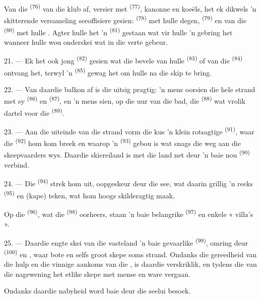 Van die  \textsuperscript{(76)} van die klub af, versier met
 \textsuperscript{(77)}, kanonne en koeëls, het ek dikwels 'n skitterende
versameling seeoffisiere gesien:  \textsuperscript{(78)} met hulle
degen,  \textsuperscript{(79)} en van die
 \textsuperscript{(80)} met hulle . Agter hulle het 'n
 \textsuperscript{(81)} gestaan wat vir hulle 'n 
gebring het wanneer hulle wou onderskei wat in die verte gebeur.

21. --- Ek het ook jong  \textsuperscript{(82)} gesien wat die
bevele van hulle  \textsuperscript{(83)} of van die 
\textsuperscript{(84)} ontvang het, terwyl 'n 
\textsuperscript{(85)} gewag het om hulle na die skip te bring.

22. --- Van daardie balkon af is die uitsig pragtig: 'n mens oorsien die hele strand met
sy  \textsuperscript{(86)} en  \textsuperscript{(87)},
en 'n mens sien, op die uur van die bad, die  \textsuperscript{(88)} wat
vrolik dartel voor die  \textsuperscript{(89)}.

23. --- Aan die uiteinde van die strand vorm die kus 'n klein rotsagtige
 \textsuperscript{(91)}, waar die 
\textsuperscript{(92)} hom kom breek en waarop 'n 
\textsuperscript{(93)} gebou is wat snags die weg aan die skeepvaarders wys. Daardie
skiereiland is met die land net deur 'n baie nou 
\textsuperscript{(90)} verbind.

\VUsaut{3.0mm}
\VUsaut{3.0mm}

24. --- Die  \textsuperscript{(94)} strek hom uit, oopgeskeur deur die
see, wat daarin grillig 'n reeks  \textsuperscript{(95)} en
 (kape) teken, wat hom hoogs skilderagtig maak.

Op die  \textsuperscript{(96)}, wat die 
\textsuperscript{(98)} oorheers, staan 'n baie belangrike 
\textsuperscript{(97)} en enkele « villa's ».

25. --- Daardie engte skei van die vasteland 'n baie gevaarlike 
\textsuperscript{(99)}, omring deur  \textsuperscript{(100)} en
, waar bote en selfs groot skepe soms strand. Ondanks die gereedheid van
die hulp en die vinnige aankoms van die , is daardie
 verskriklik, en tydens die  van die nagewening het
etlike skepe met mense en ware vergaan.

Ondanks daardie nabyheid word  baie deur die seelui besoek.
\VUsaut{6.0mm}
\VUfilet{22mm}
